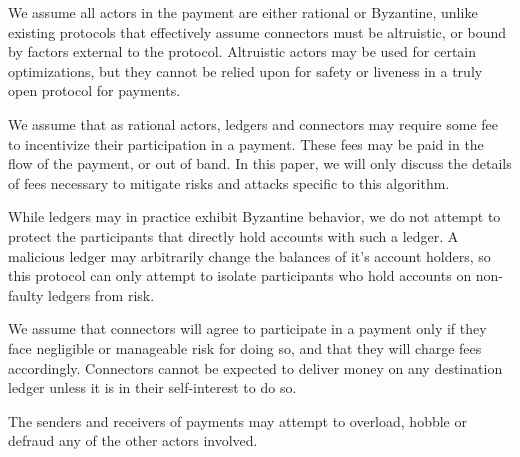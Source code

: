\documentclass[letterpaper,twocolumn,10pt]{article}
\begin{document}
We assume all actors in the payment are either rational or Byzantine, unlike existing protocols that effectively assume connectors must be altruistic, or bound by factors external to the protocol. Altruistic actors may be used for certain optimizations, but they cannot be relied upon for safety or liveness in a truly open protocol for payments.



We assume that as rational actors, ledgers and connectors may require some fee to incentivize their participation in a payment. These fees may be paid in the flow of the payment, or out of band. In this paper, we will only discuss the details of fees necessary to mitigate risks and attacks specific to this algorithm.

While ledgers may in practice exhibit Byzantine behavior, we do not attempt to protect the participants that directly hold accounts with such a ledger. A malicious ledger may arbitrarily change the balances of it's account holders, so this protocol can only attempt to isolate participants who hold accounts on non-faulty ledgers from risk.

We assume that connectors will agree to participate in a payment only if they face negligible or manageable risk for doing so, and that they will charge fees accordingly. Connectors cannot be expected to deliver money on any destination ledger unless it is in their self-interest to do so.

The senders and receivers of payments may attempt to overload, hobble or defraud any of the other actors involved.
\end{document}
